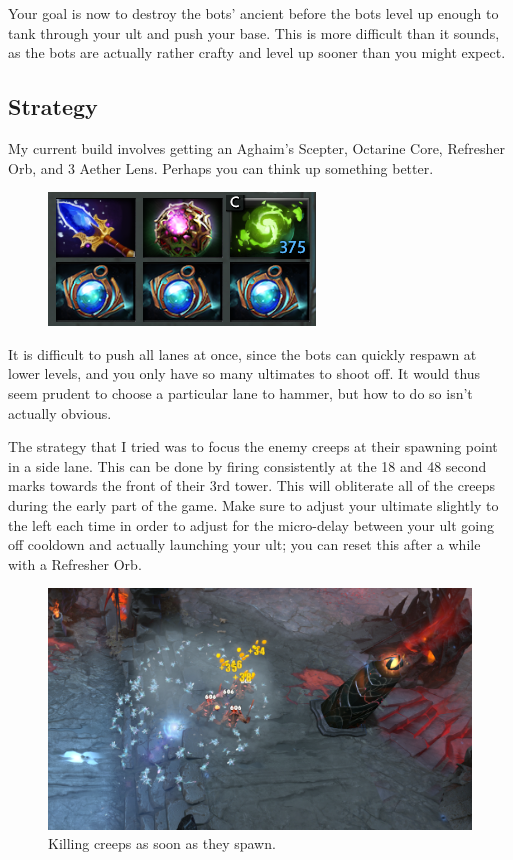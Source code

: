 \documentclass{article}
\begin{document}
Your goal is now to destroy the bots' ancient before the bots level up enough to tank through your ult and push your base.  This is more difficult than it sounds, as the bots are actually rather crafty and level up sooner than you might expect.

\subsection*{Strategy}
My current build involves getting an Aghaim's Scepter, Octarine Core, Refresher Orb, and 3 Aether Lens.  Perhaps you can think up something better.
\begin{figure}
\includegraphics{files/blog/2017_07_17_ancient_apparition_bowling/items.png}
\end{figure}

It is difficult to push all lanes at once, since the bots can quickly respawn at lower levels, and you only have so many ultimates to shoot off.  It would thus seem prudent to choose a particular lane to hammer, but how to do so isn't actually obvious.

The strategy that I tried was to focus the enemy creeps at their spawning point in a side lane.  This can be done by firing consistently at the 18 and 48 second marks towards the front of their 3rd tower. This will obliterate all of the creeps during the early part of the game.  Make sure to adjust your ultimate slightly to the left each time in order to adjust for the micro-delay between your ult going off cooldown and actually launching your ult; you can reset this after a while with a Refresher Orb.
\begin{figure}
\includegraphics[scale=0.33]{files/blog/2017_07_17_ancient_apparition_bowling/towerhit.png}
\caption{Killing creeps as soon as they spawn.}
\end{figure}
\end{document}
